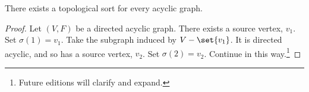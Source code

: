 \begin{proposition}
There exists a topological sort for every acyclic graph.
\end{proposition}

\begin{proof}Let $(V, F)$ be a directed acyclic graph.
There exists a source vertex, $v_1$.
Set $\sigma (1) = v_1$.
Take the subgraph induced by $V - \set{v_1}$.
It is directed acyclic, and so has a source vertex, $v_2$.
Set $\sigma (2) = v_2$.
Continue in this way.\footnote{Future editions will clarify and expand.}\end{proof}
\blankpage